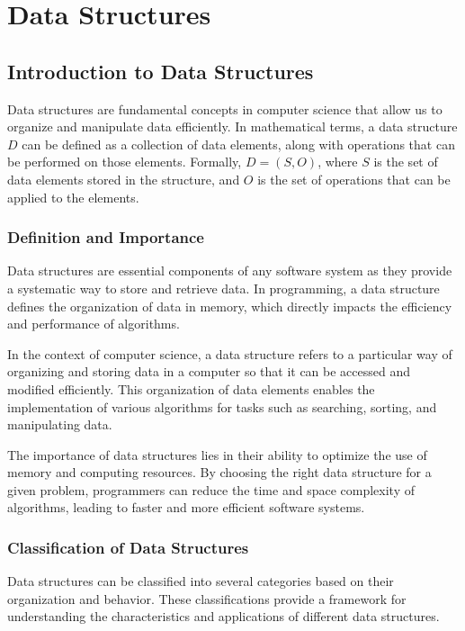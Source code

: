 \documentclass[12pt]{book} %
\begin{document}
\chapter{Data Structures}

\section{Introduction to Data Structures}

Data structures are fundamental concepts in computer science that allow us to organize and manipulate data efficiently. In mathematical terms, a data structure \(D\) can be defined as a collection of data elements, along with operations that can be performed on those elements. Formally, \(D = (S, O)\), where \(S\) is the set of data elements stored in the structure, and \(O\) is the set of operations that can be applied to the elements.

\subsection{Definition and Importance}

Data structures are essential components of any software system as they provide a systematic way to store and retrieve data. In programming, a data structure defines the organization of data in memory, which directly impacts the efficiency and performance of algorithms. 

In the context of computer science, a data structure refers to a particular way of organizing and storing data in a computer so that it can be accessed and modified efficiently. This organization of data elements enables the implementation of various algorithms for tasks such as searching, sorting, and manipulating data.

The importance of data structures lies in their ability to optimize the use of memory and computing resources. By choosing the right data structure for a given problem, programmers can reduce the time and space complexity of algorithms, leading to faster and more efficient software systems.

\subsection{Classification of Data Structures}

Data structures can be classified into several categories based on their organization and behavior. These classifications provide a framework for understanding the characteristics and applications of different data structures.
\end{document}
